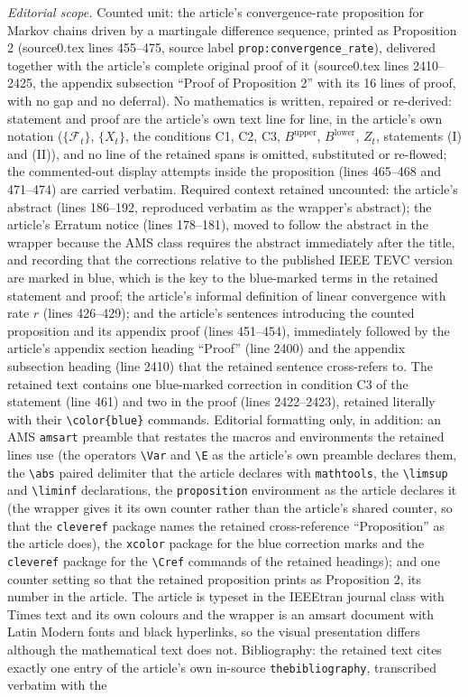 \documentclass[10pt,a4paper]{amsart}
\theoremstyle{plain}
\begin{document}
\noindent\textit{Editorial scope.} Counted unit: the article's convergence-rate proposition for Markov chains driven by a martingale difference sequence, printed as Proposition 2 (source0.tex lines 455--475, source label \texttt{prop:convergence\_rate}), delivered together with the article's complete original proof of it (source0.tex lines 2410--2425, the appendix subsection ``Proof of Proposition 2'' with its 16 lines of proof, with no gap and no deferral). No mathematics is written, repaired or re-derived: statement and proof are the article's own text line for line, in the article's own notation ($\{\mathcal{F}_t\}$, $\{X_t\}$, the conditions C1, C2, C3, $B^\mathrm{upper}$, $B^\mathrm{lower}$, $Z_t$, statements (I) and (II)), and no line of the retained spans is omitted, substituted or re-flowed; the commented-out display attempts inside the proposition (lines 465--468 and 471--474) are carried verbatim. Required context retained uncounted: the article's abstract (lines 186--192, reproduced verbatim as the wrapper's abstract); the article's Erratum notice (lines 178--181), moved to follow the abstract in the wrapper because the AMS class requires the abstract immediately after the title, and recording that the corrections relative to the published IEEE TEVC version are marked in blue, which is the key to the blue-marked terms in the retained statement and proof; the article's informal definition of linear convergence with rate $r$ (lines 426--429); and the article's sentences introducing the counted proposition and its appendix proof (lines 451--454), immediately followed by the article's appendix section heading ``Proof'' (line 2400) and the appendix subsection heading (line 2410) that the retained sentence cross-refers to. The retained text contains one blue-marked correction in condition C3 of the statement (line 461) and two in the proof (lines 2422--2423), retained literally with their \texttt{\textbackslash color\{blue\}} commands. Editorial formatting only, in addition: an AMS \texttt{amsart} preamble that restates the macros and environments the retained lines use (the operators \texttt{\textbackslash Var} and \texttt{\textbackslash E} as the article's own preamble declares them, the \texttt{\textbackslash abs} paired delimiter that the article declares with \texttt{mathtools}, the \texttt{\textbackslash limsup} and \texttt{\textbackslash liminf} declarations, the \texttt{proposition} environment as the article declares it (the wrapper gives it its own counter rather than the article's shared counter, so that the \texttt{cleveref} package names the retained cross-reference ``Proposition'' as the article does), the \texttt{xcolor} package for the blue correction marks and the \texttt{cleveref} package for the \texttt{\textbackslash Cref} commands of the retained headings); and one counter setting so that the retained proposition prints as Proposition 2, its number in the article. The article is typeset in the IEEEtran journal class with Times text and its own colours and the wrapper is an amsart document with Latin Modern fonts and black hyperlinks, so the visual presentation differs although the mathematical text does not. Bibliography: the retained text cites exactly one entry of the article's own in-source \texttt{thebibliography}, transcribed verbatim with the 
\end{document}
